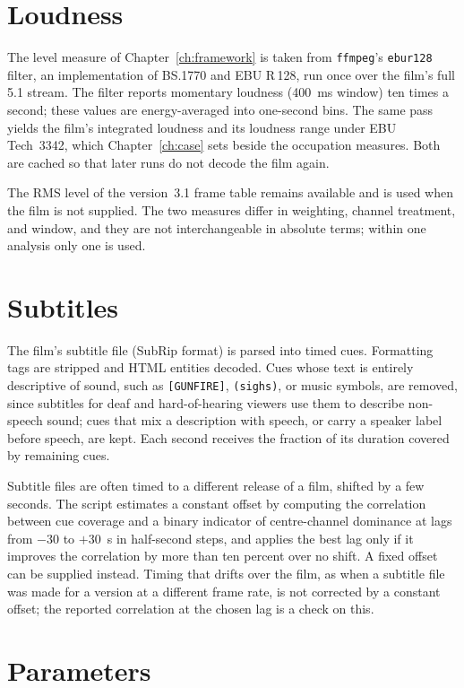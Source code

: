 \section{Loudness}

The level measure of Chapter~\ref{ch:framework} is taken from \texttt{ffmpeg}'s \texttt{ebur128} filter, an implementation of BS.1770 and EBU R\,128, run once over the film's full 5.1 stream. The filter reports momentary loudness (400~ms window) ten times a second; these values are energy-averaged into one-second bins. The same pass yields the film's integrated loudness and its loudness range under EBU Tech~3342, which Chapter~\ref{ch:case} sets beside the occupation measures. Both are cached so that later runs do not decode the film again.

The RMS level of the version~3.1 frame table remains available and is used when the film is not supplied. The two measures differ in weighting, channel treatment, and window, and they are not interchangeable in absolute terms; within one analysis only one is used.

\section{Subtitles}

The film's subtitle file (SubRip format) is parsed into timed cues. Formatting tags are stripped and HTML entities decoded. Cues whose text is entirely descriptive of sound, such as \texttt{[GUNFIRE]}, \texttt{(sighs)}, or music symbols, are removed, since subtitles for deaf and hard-of-hearing viewers use them to describe non-speech sound; cues that mix a description with speech, or carry a speaker label before speech, are kept. Each second receives the fraction of its duration covered by remaining cues.

Subtitle files are often timed to a different release of a film, shifted by a few seconds. The script estimates a constant offset by computing the correlation between cue coverage and a binary indicator of centre-channel dominance at lags from $-30$ to $+30$~s in half-second steps, and applies the best lag only if it improves the correlation by more than ten percent over no shift. A fixed offset can be supplied instead. Timing that drifts over the film, as when a subtitle file was made for a version at a different frame rate, is not corrected by a constant offset; the reported correlation at the chosen lag is a check on this.

\section{Parameters}

